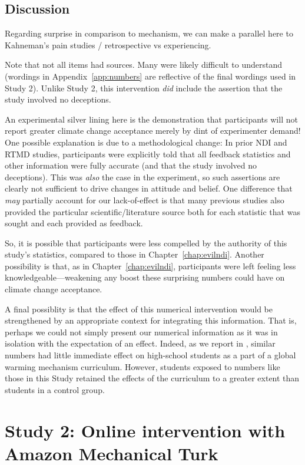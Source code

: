\subsection{Discussion}

Regarding surprise in comparison to mechanism, we can make a parallel here to
Kahneman's pain studies / retrospective vs experiencing.

Note that not all items had sources. Many were likely difficult to understand
(wordings in Appendix~\ref{app:numbers} are reflective of the final wordings
used in Study 2). Unlike Study 2, this intervention \emph{did} include the
assertion that the study involved no deceptions.

An experimental silver lining here is the demonstration that
participants will not report greater climate change acceptance merely by dint of
experimenter demand! One possible explanation is due to a methodological change:
In prior NDI and RTMD studies, participants were explicitly told that all
feedback statistics and other information were fully accurate (and that the
study involved no deceptions). This was \emph{also} the case in the experiment,
so such assertions are clearly not sufficient to drive changes in attitude and
belief.  One difference that \emph{may} partially account for our lack-of-effect
is that many previous studies also provided the particular scientific/literature
source both for each statistic that was sought and each provided as feedback.

So, it is possible that participants were less compelled by the authority of
this study’s statistics, compared to those in Chapter~\ref{chap:evilndi}.
Another possibility is that, as in Chapter~\ref{chap:evilndi}, participants were
left feeling less knowledgeable—weakening any boost these surprising numbers
could have on climate change acceptance.  

A final possiblity is that the effect of this numerical intervention would be
strengthened by an appropriate context for integrating this information. That
is, perhaps we could not simply present our numerical information as it was in
isolation with the expectation of an effect. Indeed, as we report in
\cite{clark_knowledge_inpress}, similar numbers had little immediate effect on
high-school students as a part of a global warming mechanism curriculum.
However, students exposed to numbers like those in this Study retained the
effects of the curriculum to a greater extent than students in a control group.

\section{Study 2: Online intervention with Amazon Mechanical Turk}
\label{sec:pro-mturk}


